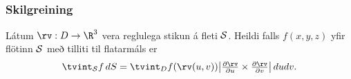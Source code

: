 \subsection{} 

\subsubsection{Skilgreining \rtask{}}
 Látum $\rv: D\rightarrow \R^3$ vera
reglulega stikun á fleti $\cal S$.   
Heildi falls $f(x,y,z)$ yfir flötinn $\cal S$ með tilliti til flatarmáls er
$$\tvint_{\cal S} f\,dS=\tvint_D f(\rv(u,v)) \big|{\textstyle\frac{\partial
    \rv}{\partial u} 
\times\frac{\partial \rv}{\partial v}}\big|\,dudv.$$





